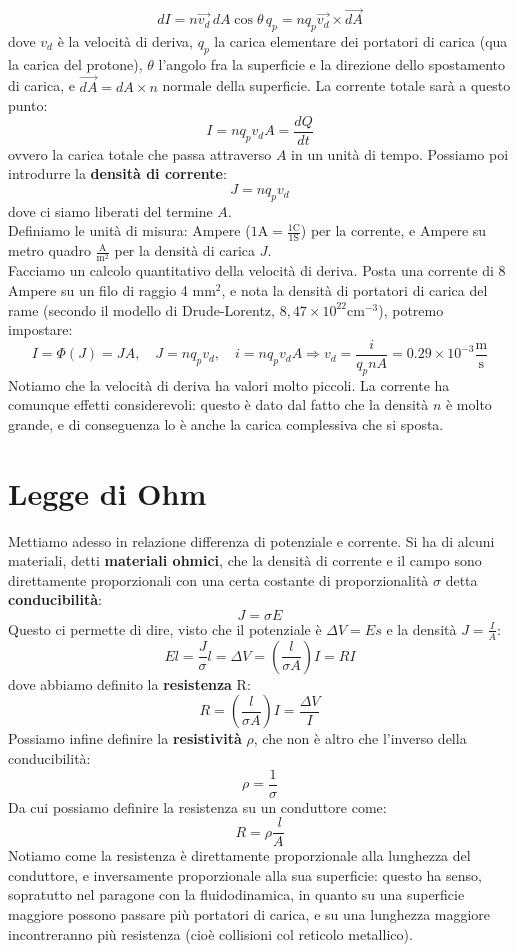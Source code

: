 \documentclass[a4paper,12pt]{article}
\begin{document}
$$ dI = n\vec{v_d}\,dA\cos{\theta}\,q_p = nq_p\vec{v_d} \times \vec{dA} $$
dove $v_d$ è la velocità di deriva, $q_p$ la carica elementare dei portatori di carica (qua la carica del protone), $\theta$ l'angolo fra la superficie e la direzione dello spostamento di carica, e $\vec{dA} = dA \times n$ normale
della superficie. La corrente totale sarà a questo punto:
$$ I = nq_pv_dA = \frac{dQ}{dt} $$
ovvero la carica totale che passa attraverso $A$ in un unità di tempo. Possiamo poi introdurre la \textbf{densità di corrente}:
$$ J = nq_pv_d $$
dove ci siamo liberati del termine $A$. \\
Definiamo le unità di misura: Ampere ($1\mathrm{A} = \frac{1\mathrm{C}}{1\mathrm{S}}$) per la corrente, e  Ampere su metro quadro $\frac{\mathrm{A}}{\mathrm{m^2}}$ per la densità di carica $J$. \\
Facciamo un calcolo quantitativo della velocità di deriva. Posta una corrente di 8 Ampere su un filo di raggio 4 $\mathrm{mm}^2$, e nota la densità di portatori di carica del rame (secondo il modello di Drude-Lorentz, $8,47 \times 10^{22} \mathrm{cm}^{-3}$), potremo impostare:
$$ I = \Phi(J) = JA, \quad J = nq_pv_d, \quad i = nq_pv_dA \Rightarrow v_d = \frac{i}{q_p n A} = 0.29 \times 10^{-3} \frac{\mathrm{m}}{\mathrm{s}} $$
Notiamo che la velocità di deriva ha valori molto piccoli. La corrente ha comunque effetti considerevoli: questo è dato dal fatto che la densità $n$ è molto grande, e di conseguenza lo è anche la carica complessiva che si sposta.
\section{Legge di Ohm}
Mettiamo adesso in relazione differenza di potenziale e corrente. Si ha di alcuni materiali, detti \textbf{materiali ohmici}, che la densità di corrente e il campo sono direttamente proporzionali con una certa costante di proporzionalità
$\sigma$ detta \textbf{conducibilità}:
$$ J = \sigma E $$
Questo ci permette di dire, visto che il potenziale è $\Delta V = Es$ e la densità $J = \frac{I}{A}$:
$$ El = \frac{J}{\sigma}l = \Delta V = \left(\frac{l}{\sigma A}\right)I = RI $$
dove abbiamo definito la \textbf{resistenza} R:
$$ R = \left(\frac{l}{\sigma A}\right)I = \frac{\Delta V}{I} $$
Possiamo infine definire la \textbf{resistività} $\rho$, che non è altro che l'inverso della conducibilità:
$$ \rho = \frac{1}{\sigma} $$
Da cui possiamo definire la resistenza su un conduttore come:
$$ R =  \rho\frac{\ l}{A} $$
Notiamo come la resistenza è direttamente proporzionale alla lunghezza del conduttore, e inversamente proporzionale alla sua superficie: questo ha senso, sopratutto nel paragone con la fluidodinamica, in quanto su una superficie maggiore
possono passare più portatori di carica, e su una lunghezza maggiore incontreranno più resistenza (cioè collisioni col reticolo metallico).
\end{document}
